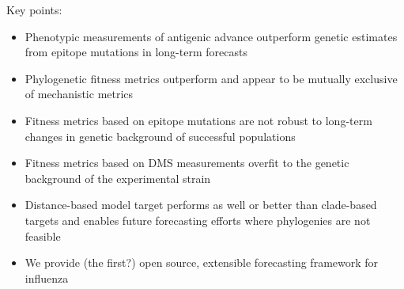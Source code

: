 Key points:

\begin{itemize}
\item{Phenotypic measurements of antigenic advance outperform genetic estimates from epitope mutations in long-term forecasts}
\item{Phylogenetic fitness metrics outperform and appear to be mutually exclusive of mechanistic metrics}
\item{Fitness metrics based on epitope mutations are not robust to long-term changes in genetic background of successful populations}
\item{Fitness metrics based on DMS measurements overfit to the genetic background of the experimental strain}
\item{Distance-based model target performs as well or better than clade-based targets and enables future forecasting efforts where phylogenies are not feasible}
\item{We provide (the first?) open source, extensible forecasting framework for influenza}
\end{itemize}

